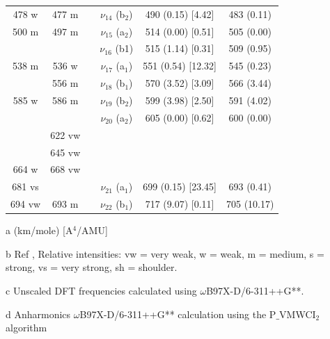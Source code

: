 \begin{table}[H]
\begin{center}
\begin{threeparttable}
\begin{tabular}{c c c c c c}
478 w & 477 m &  & $\nu_{14}$ (b$_{2}$) & 490 (0.15) [4.42] & 483 (0.11) \\ 
500 m & 497 m &  & $\nu_{15}$ (a$_{2}$) & 514 (0.00) [0.51] & 505 (0.00) \\ 
&  &  & $\nu_{16}$ (b1) & 515 (1.14) [0.31] & 509 (0.95) \\ 
538 m & 536 w &  & $\nu_{17}$ (a$_{1}$) & 551 (0.54) [12.32] & 545 (0.23) \\ 
& 556 m &  & $\nu_{18}$ (b$_{1}$) & 570 (3.52) [3.09] & 566 (3.44) \\ 
585 w & 586 m &  & $\nu_{19}$ (b$_{2}$) & 599 (3.98) [2.50] & 591 (4.02) \\ 
&  &  & $\nu_{20}$ (a$_{2}$) & 605 (0.00) [0.62] & 600 (0.00) \\ 
& 622 vw &  &  &  & \multicolumn{1}{l}{} \\ 
& 645 vw &  &  &  &  \\ 
664 w & 668 vw &  &  & \multicolumn{1}{c}{} &  \\ 
681 vs &  &  & \multicolumn{1}{c}{$\nu_{21}$ (a$_{1}$)} & 699 (0.15) [23.45] & 693 (0.41) \\ 
694 vw & 693 m &  & \multicolumn{1}{c}{$\nu_{22}$ (b$_{1}$)} & \multicolumn{1}{c}{717 (9.07) [0.11]} & 705 (10.17) \\ 
\bottomrule
\end{tabular}

\begin{tablenotes}
	\item[a] (km/mole) [A$^{4}$/AMU]
	\item[b] Ref \cite{michaelian2014raman}, Relative intensities: vw = very weak, w = weak, m = medium, s = strong, vs = very strong, sh = shoulder.
	\item[c] Unscaled DFT frequencies calculated using $\omega$B97X-D/6-311++G**.
	\item[d] Anharmonics $\omega$B97X-D/6-311++G** calculation using the P$\_$VMWCI$_{2}$ algorithm
\end{tablenotes}
\end{threeparttable}
\end{center}
\label{lowfreq-18-dimethylfluorene}
\end{table}


   
   
